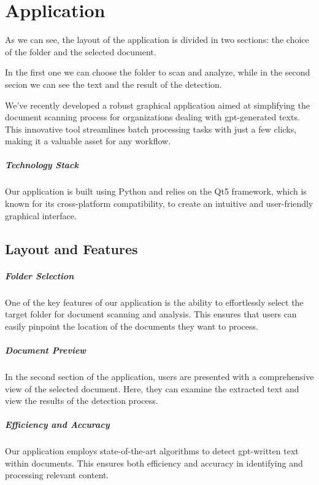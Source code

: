 \chapter{Application}

As we can see, the layout of the application is divided in two sections: the choice of the folder and the selected document.

In the first one we can choose the folder to scan and analyze, while in the second secion we can see the text and the
result of the detection.


We've recently developed a robust graphical application aimed at simplifying the document scanning process for 
organizations dealing with gpt-generated texts. This innovative tool streamlines batch processing tasks with just 
a few clicks, making it a valuable asset for any workflow.

\paragraph{Technology Stack} Our application is built using Python and relies on the Qt5 framework, which is known 
for its cross-platform compatibility, to create an intuitive and user-friendly graphical interface.

\section{Layout and Features}

\paragraph{Folder Selection} One of the key features of our application is the ability to effortlessly select the 
target folder for document scanning and analysis. This ensures that users can easily pinpoint the location of the 
documents they want to process.

\paragraph{Document Preview} In the second section of the application, users are presented with a comprehensive 
view of the selected document. Here, they can examine the extracted text and view the results of the detection process.

\paragraph{Efficiency and Accuracy} Our application employs state-of-the-art algorithms to detect gpt-written 
text within documents. This ensures both efficiency and accuracy in identifying and processing relevant content.

